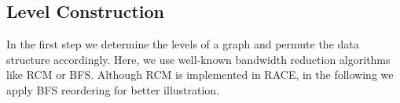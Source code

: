 \subsection{Level Construction}
In the first step we determine the levels of a graph and permute the data structure accordingly.
Here, we  use well-known bandwidth reduction algorithms like \Acrfull{RCM}\cite{RCM}
or \Acrfull{BFS}\cite{BFS}. Although \acrshort{RCM} is implemented in \acrshort{RACE},
in the following we apply \acrshort{BFS} reordering for better illustration.
\begin{figure}[tb]
\end{figure}

